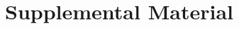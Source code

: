 \documentclass[amsmath, amssymb, aps, prl, reprint, superscriptaddress]{revtex4-2}
\begin{document}

\title{Supplemental Material}





\end{document}
